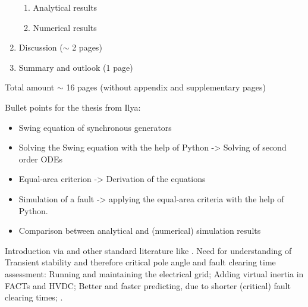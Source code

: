 \begin{enumerate}
\begin{enumerate}
        \item Analytical results
        \item Numerical results
    \end{enumerate}
    \item Discussion ($\sim$ 2 pages)
    \item Summary and outlook (1 page)
\end{enumerate}

Total amount $\sim$ 16 pages (without appendix and supplementary pages)

\newpage
Bullet points for the thesis from Ilya:
\begin{itemize}
    \item Swing equation of synchronous generators
    \item Solving the Swing equation with the help of Python -> Solving of second order ODEs
    \item Equal-area criterion -> Derivation of the equations
    \item Simulation of a fault -> applying the equal-area criteria with the help of Python.
    \item Comparison between analytical and (numerical) simulation results
\end{itemize}


Introduction via \autocite{vdeverbandderelektrotechnikelektronikinformationstechnike.v.PerspektivenElektrischenEnergieubertragung2019} and other standard literature like \autocite{gloverPowerSystemAnalysis2017,kundurPowerSystemStability2022,machowskiPowerSystemDynamics2020,oedingElektrischeKraftwerkeUnd2016,schwabElektroenergiesystemeSmarteStromversorgung2022}. Need for understanding of Transient stability and therefore critical pole angle and fault clearing time assessment: Running and maintaining the electrical grid; Adding virtual inertia in FACTs and HVDC; Better and faster predicting, due to shorter (critical) fault clearing times; .